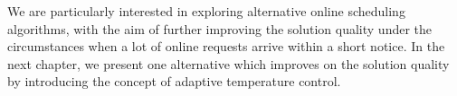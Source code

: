 We are particularly interested in exploring alternative online scheduling algorithms, with the aim of further improving the solution quality under the circumstances when a lot of online requests arrive within a short notice. In the next chapter, we present one alternative which improves on the solution quality by introducing the concept of adaptive temperature control.


